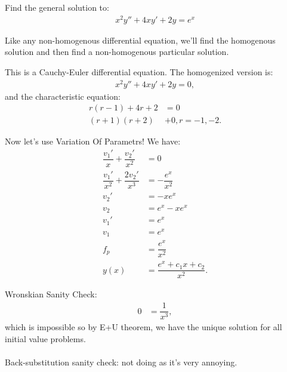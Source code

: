 \documentclass[11pt]{article}
\begin{document}
    \newpage \setcounter{equation}{-1} \begin{problem} [Problem 3]
        Find the general solution to:
        \begin{align}
            x^2y'' + 4xy' + 2y = e^x
        \end{align}
    \end{problem}
        \begin{remark}[Method.]
            Like any non-homogenous differential equation, we'll find the homogenous solution and then find a non-homogenous particular solution.
        \end{remark}
        \begin{solution}[Solution 3a]
            This is a Cauchy-Euler differential equation. The homogenized version is:
            \begin{align}
                x^2y'' + 4xy' + 2y = 0,
            \end{align}
            and the characteristic equation:
            \begin{align}
                r(r-1) + 4r + 2 &= 0 \\
                (r+1)(r+2) &+ 0, r= -1,-2.
            \end{align}
        \end{solution}
        \begin{solution}[Solution 3b]
            Now let's use Variation Of Parametrs! We have:
            \begin{align}
                \dfrac{v_1'}{x} + \dfrac{v_2'}{x^2} &= 0 \\
                \dfrac{v_1'}{x^2} + \dfrac{2v_2'}{x^3} &= -\dfrac{e^x}{x^2} \\
                v_2' &= -xe^x \\
                v_2 &= e^x-xe^x \\
                v_1' &= e^x \\
                v_1 &= e^x \\
                f_p &= \dfrac{e^x}{x^2} \\
                y(x) &= \dfrac{e^x + c_1x + c_2}{x^2}.
            \end{align}
        \end{solution}
        \begin{remark}[Footnotes.]
            Wronskian Sanity Check:
            \begin{align}
                0 &= \dfrac{1}{x^3},
            \end{align}
            which is impossible so by E+U theorem, we have the unique solution for all initial value problems. \\~\\
            Back-substitution sanity check: not doing as it's very annoying.
        \end{remark}
\end{document}

